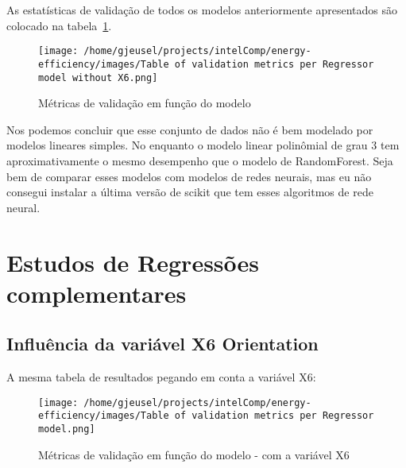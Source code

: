 \documentclass[paper=a4, fontsize=11pt]{article} %
\numberwithin{equation}{section} %
\numberwithin{figure}{section} %
\numberwithin{table}{section} %
\begin{document}
As estatísticas de validação de todos os modelos anteriormente apresentados são colocado na tabela~\ref{table_all_results}.

\begin{figure}[H] %
\begin{center}
\texttt{[image: /home/gjeusel/projects/intelComp/energy-efficiency/images/Table of validation metrics per Regressor model without X6.png]}
\end{center}
\caption{Métricas de validação em função do modelo}
\label{table_all_results}
\end{figure}

Nos podemos concluir que esse conjunto de dados não é bem modelado por modelos lineares simples.
No enquanto o modelo linear polinômial de grau 3 tem aproximativamente o mesmo desempenho que o modelo de RandomForest.
Seja bem de comparar esses modelos com modelos de redes neurais, mas eu não consegui instalar a última versão de scikit que tem esses algoritmos de rede neural.


\newpage
\section{Estudos de Regressões complementares}

\subsection{Influência da variável X6 Orientation}

A mesma tabela de resultados pegando em conta a variável X6:

\begin{figure}[H] %
\begin{center}
\texttt{[image: /home/gjeusel/projects/intelComp/energy-efficiency/images/Table of validation metrics per Regressor model.png]}
\end{center}
\caption{Métricas de validação em função do modelo - com a variável X6}
\label{table_all_results_withX6}
\end{figure}
\end{document}
